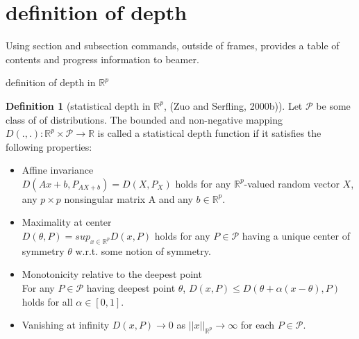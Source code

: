 \documentclass[aspectratio=169,ignorenonframetext,9pt]{beamer}
\theoremstyle{plain}
\theoremstyle{definition}
\newtheorem{defn}{Definition}[section]
\begin{document}
\section{definition of depth}
Using section and subsection commands, outside of frames, provides a table of contents and progress information to beamer.
\begin{frame}{definition of depth in $\mathbb{R}^p$}
\begin{defn}[statistical depth in $\mathbb{R}^p$, (Zuo and Serfling, 2000b)]
Let $\mathcal{P}$ be some class of of distributions.
The bounded and non-negative mapping $D(.,.): \mathbb{R}^p\times \mathcal{P} \rightarrow \mathbb{R}$ is called
a statistical depth function if it satisfies the following properties:
\begin{itemize}
    \item Affine invariance \\
        $D(Ax+b,P_{AX+b})=D(X,P_X)$ holds for any $\mathbb{R}^p$-valued random vector $X$,
        any $p\times p$ nonsingular matrix A and any $b\in \mathbb{R}^p$.
    \item Maximality at center \\
        $D(\theta,P)=sup_{x\in\mathbb{R}^p}D(x,P)$ holds for any $P\in\mathcal{P}$
        having a unique center of symmetry $\theta$ w.r.t. some notion of symmetry.
    \item Monotonicity relative to the deepest point \\
        For any $P \in \mathcal{P}$ having deepest point $\theta$, $D(x,P)\leq D(\theta+\alpha(x-\theta), P)$
        holds for all $\alpha\in[0,1]$.
    \item Vanishing at infinity
        $D(x,P)\rightarrow0$ as $||x||_{\mathbb{R}^p}\rightarrow\infty$
        for each $P\in\mathcal{P}$.
\end{itemize}
\end{defn}
\end{frame}
\end{document}
